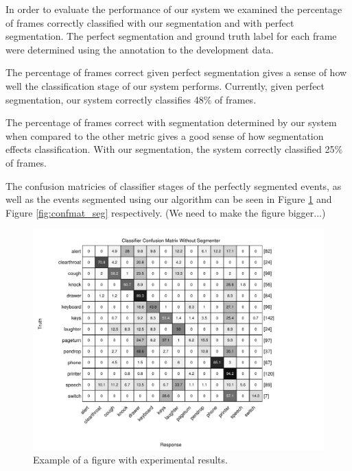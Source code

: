 In order to evaluate the performance of our system we examined the percentage of frames 
correctly classified with our segmentation and with perfect segmentation. The perfect
segmentation and ground truth label for each frame were determined using the annotation
to the development data.

The percentage of frames correct given perfect segmentation gives a sense of how well the
classification stage of our system performs. Currently, given perfect segmentation,
our system correctly classifies 48\% of frames. 

The percentage of frames correct with segmentation determined by our system when compared to the other metric
gives a good sense of how segmentation effects classification. With our segmentation, the 
system correctly classified 25\% of frames.

The confusion matricies of classifier stages of the perfectly segmented events, as well as the events segmented using our algorithm can be seen in Figure \ref{fig:confmat_perfect} and Figure \ref{fig:confmat_seg} respectively. (We need to make the figure bigger...)

\begin{figure}[h]
  \centering
  \centerline{\includegraphics[width=\columnwidth]{confmatrix1-eps-converted-to.pdf}}
  \caption{Example of a figure with experimental results.}
  \label{fig:confmat_perfect}
\end{figure}

